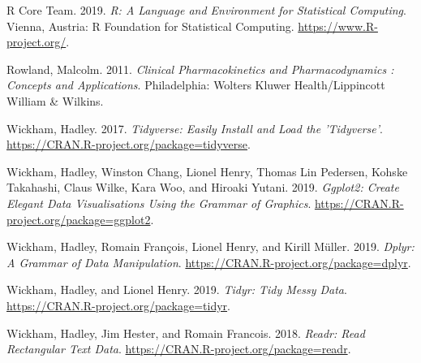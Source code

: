 \documentclass[12pt,]{krantz}
\begin{document}
\leavevmode\hypertarget{ref-R-base}{}%
R Core Team. 2019. \emph{R: A Language and Environment for Statistical Computing}. Vienna, Austria: R Foundation for Statistical Computing. \url{https://www.R-project.org/}.

\leavevmode\hypertarget{ref-tozer}{}%
Rowland, Malcolm. 2011. \emph{Clinical Pharmacokinetics and Pharmacodynamics : Concepts and Applications}. Philadelphia: Wolters Kluwer Health/Lippincott William \& Wilkins.

\leavevmode\hypertarget{ref-R-tidyverse}{}%
Wickham, Hadley. 2017. \emph{Tidyverse: Easily Install and Load the 'Tidyverse'}. \url{https://CRAN.R-project.org/package=tidyverse}.

\leavevmode\hypertarget{ref-R-ggplot2}{}%
Wickham, Hadley, Winston Chang, Lionel Henry, Thomas Lin Pedersen, Kohske Takahashi, Claus Wilke, Kara Woo, and Hiroaki Yutani. 2019. \emph{Ggplot2: Create Elegant Data Visualisations Using the Grammar of Graphics}. \url{https://CRAN.R-project.org/package=ggplot2}.

\leavevmode\hypertarget{ref-R-dplyr}{}%
Wickham, Hadley, Romain François, Lionel Henry, and Kirill Müller. 2019. \emph{Dplyr: A Grammar of Data Manipulation}. \url{https://CRAN.R-project.org/package=dplyr}.

\leavevmode\hypertarget{ref-R-tidyr}{}%
Wickham, Hadley, and Lionel Henry. 2019. \emph{Tidyr: Tidy Messy Data}. \url{https://CRAN.R-project.org/package=tidyr}.

\leavevmode\hypertarget{ref-R-readr}{}%
Wickham, Hadley, Jim Hester, and Romain Francois. 2018. \emph{Readr: Read Rectangular Text Data}. \url{https://CRAN.R-project.org/package=readr}.
\end{document}
